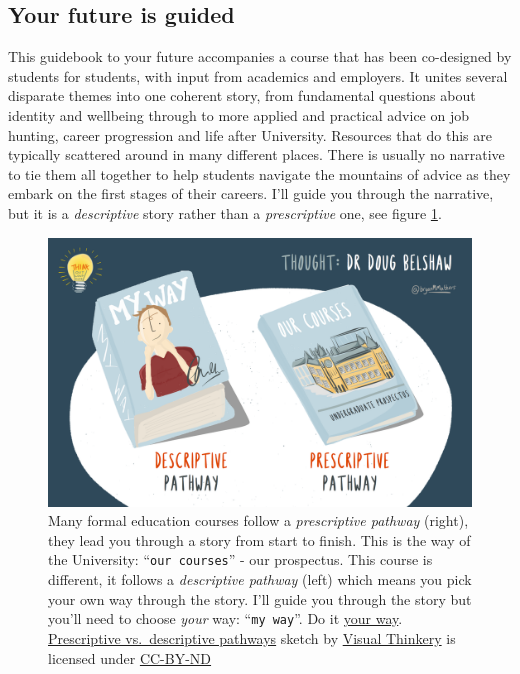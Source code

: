 \documentclass[
]{book}
\begin{document}
\hypertarget{study}{%
\subsection{Your future is guided}\label{study}}

This guidebook to your future accompanies a course that has been co-designed by students for students, with input from academics and employers. It unites several disparate themes into one coherent story, from fundamental questions about identity and wellbeing through to more applied and practical advice on job hunting, career progression and life after University. Resources that do this are typically scattered around in many different places. There is usually no narrative to tie them all together to help students navigate the mountains of advice as they embark on the first stages of their careers. I'll guide you through the narrative, but it is a \emph{descriptive} story rather than a \emph{prescriptive} one, see figure \ref{fig:descriptive-fig}.

\begin{figure}

{\centering \includegraphics[width=1\linewidth]{images/prescriptive-vs-descriptive-pathways} 

}

\caption{Many formal education courses follow a \emph{prescriptive pathway} (right), they lead you through a story from start to finish. This is the way of the University: ``\texttt{our\ courses}'' - our prospectus. This course is different, it follows a \emph{descriptive pathway} (left) which means you pick your own way through the story. I'll guide you through the story but you'll need to choose \emph{your} way: ``\texttt{my\ way}''. Do it \href{https://en.wikipedia.org/wiki/My_Way}{your way}. \citep{sinatra} \href{https://bryanmmathers.com/prescriptive-vs-descriptive-pathways/}{Prescriptive vs.~descriptive pathways} sketch by \href{https://visualthinkery.com/}{Visual Thinkery} is licensed under \href{https://creativecommons.org/licenses/by-nd/4.0/}{CC-BY-ND}}\label{fig:descriptive-fig}
\end{figure}
\end{document}

